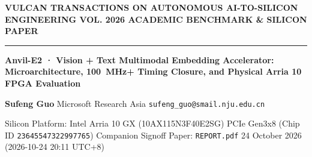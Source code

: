 \documentclass[11pt,a4paper]{article}
\begin{document}
{\scriptsize\sffamily\textcolor{vulcan}{\textbf{VULCAN TRANSACTIONS ON AUTONOMOUS AI-TO-SILICON ENGINEERING \hfill VOL. 2026 \textperiodcentered{} ACADEMIC BENCHMARK \& SILICON PAPER}}\par}

\vspace{1pt}\textcolor{vulcan}{\rule{\textwidth}{1.2pt}}\vspace{3pt}

\begin{center}

{\sffamily\LARGE\bfseries Anvil-E2 · Vision +\allowbreak{} Text Multimodal Embedding Accelerator: Microarchitecture, 100~MHz+ Timing Closure, and Physical Arria 10 FPGA Evaluation\par}\vspace{3pt}

{\small\sffamily\textbf{Sufeng Guo} \textperiodcentered{} Microsoft Research Asia \textperiodcentered{} \texttt{sufeng\_guo@smail.nju.edu.cn}\par}\vspace{1pt}

{\scriptsize\sffamily\textcolor{black!75}{Silicon Platform: Intel Arria 10 GX (\allowbreak{}10AX115N3F40E2SG)\allowbreak{} PCIe Gen3x8 (Chip ID \texttt{23645547322997765}) \textperiodcentered{} Companion Signoff Paper: \texttt{REPORT.pdf} \textperiodcentered{} 24 October 2026 (\allowbreak{}2026-10-24 20:11 UTC+\allowbreak{}8)\allowbreak{}}\par}

\end{center}\vspace{2pt}
\end{document}
